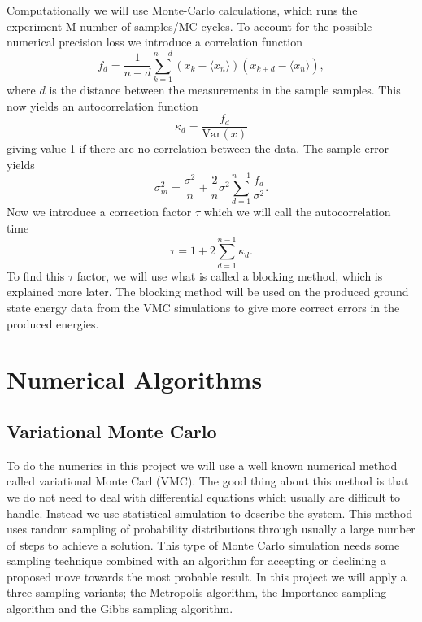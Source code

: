 \documentclass[12pt,a4paper,english]{article}
\begin{document}
Computationally we will use Monte-Carlo calculations, which runs the experiment M number of samples/MC cycles. To account for the possible numerical precision loss we introduce a correlation function 
\begin{equation}
\label{eq:stat_corr_func}
f_d=\frac{1}{n-d}\sum_{k=1}^{n-d}(x_k-\langle x_n\rangle)(x_{k+d}-\langle x_n\rangle),
\end{equation}
where $d$ is the distance between the measurements in the sample samples. This now yields an autocorrelation function
\begin{equation}
\label{eq:stat_autocorr}
\kappa_d=\frac{f_d}{\text{Var}(x)}
\end{equation}
giving value 1 if there are no correlation between the data. The sample error yields
\begin{equation*}
\sigma_m^2=\frac{\sigma^2}{n}+\frac{2}{n}\sigma^2\sum_{d=1}^{n-1}\frac{f_d}{\sigma^2}.
\end{equation*}
Now we introduce a correction factor $\tau$ which we will call the autocorrelation time
\begin{equation}
\label{eq:stat_autocorr_time}
\tau= 1+2\sum_{d=1}^{n-1}\kappa_d.
\end{equation}
To find this $\tau$ factor, we will use what is called a blocking method, which is explained more later. The blocking method will be used on the produced ground state energy data from the VMC simulations to give more correct errors in the produced energies.

\section{Numerical Algorithms}
\label{sect:Num_algos}
\subsection{Variational Monte Carlo}
\label{subsect:VMC}
To do the numerics in this project we will use a well known numerical method called variational Monte Carl (VMC). The good thing about this method is that we do not need to deal with differential equations which usually are difficult to handle. Instead we use statistical simulation to describe the system. This method uses random sampling of probability distributions through usually a large number of steps to achieve a solution. This type of Monte Carlo simulation needs some sampling technique combined with an algorithm for accepting or declining a proposed move towards the most probable result. In this project we will apply a three sampling variants; the Metropolis algorithm, the Importance sampling algorithm and the Gibbs sampling algorithm.
\end{document}
